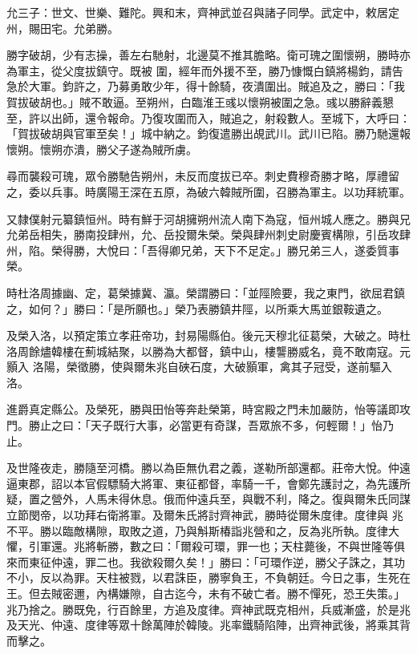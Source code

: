 \begin{pinyinscope}
 允三子：世文、世樂、難陀。興和末，齊神武並召與諸子同學。武定中，敕居定州，賜田宅。允弟勝。



 勝字破胡，少有志操，善左右馳射，北邊莫不推其膽略。衛可瑰之圍懷朔，勝時亦為軍主，從父度拔鎮守。既被
 圍，經年而外援不至，勝乃慷慨白鎮將楊鈞，請告急於大軍。鈞許之，乃募勇敢少年，得十餘騎，夜潰圍出。賊追及之，勝曰：「我賀拔破胡也。」賊不敢逼。至朔州，白臨淮王彧以懷朔被圍之急。彧以勝辭義懇至，許以出師，還令報命。乃復攻圍而入，賊追之，射殺數人。至城下，大呼曰：「賀拔破胡與官軍至矣！」城中納之。鈞復遣勝出覘武川。武川已陷。勝乃馳還報懷朔。懷朔亦潰，勝父子遂為賊所虜。



 尋而襲殺可瑰，眾令勝馳告朔州，未反而度拔已卒。刺史費穆奇勝才略，厚禮留之，委以兵事。時廣陽王深在五原，為破六韓賊所圍，召勝為軍主。以功拜統軍。



 又隸僕射元纂鎮恒州。時有鮮于河胡擁朔州流人南下為寇，恒州城人應之。勝與兄允弟岳相失，勝南投肆州，允、岳投爾朱榮。榮與肆州刺史尉慶賓構隙，引岳攻肆州，陷。榮得勝，大悅曰：「吾得卿兄弟，天下不足定。」勝兄弟三人，遂委質事榮。



 時杜洛周據幽、定，葛榮據冀、瀛。榮謂勝曰：「並陘險要，我之東門，欲屈君鎮之，如何？」勝曰：「是所願也。」榮乃表勝鎮井陘，以所乘大馬並銀鞍遺之。



 及榮入洛，以預定策立孝莊帝功，封易陽縣伯。後元天穆北征葛榮，大破之。時杜洛周餘燼韓樓在薊城結聚，以勝為大都督，鎮中山，樓讋勝威名，竟不敢南寇。元顥入
 洛陽，榮徵勝，使與爾朱兆自硤石度，大破顥軍，禽其子冠受，遂前驅入洛。



 進爵真定縣公。及榮死，勝與田怡等奔赴榮第，時宮殿之門未加嚴防，怡等議即攻門。勝止之曰：「天子既行大事，必當更有奇謀，吾眾旅不多，何輕爾！」怡乃止。



 及世隆夜走，勝隨至河橋。勝以為臣無仇君之義，遂勒所部還都。莊帝大悅。仲遠逼東郡，詔以本官假驃騎大將軍、東征都督，率騎一千，會鄭先護討之，為先護所疑，置之營外，人馬未得休息。俄而仲遠兵至，與戰不利，降之。復與爾朱氏同謀立節閔帝，以功拜右衛將軍。及爾朱氏將討齊神武，勝時從爾朱度律。度律與
 兆不平。勝以臨敵構隙，取敗之道，乃與斛斯椿詣兆營和之，反為兆所執。度律大懼，引軍還。兆將斬勝，數之曰：「爾殺可環，罪一也；天柱薨後，不與世隆等俱來而東征仲遠，罪二也。我欲殺爾久矣！」勝曰：「可環作逆，勝父子誅之，其功不小，反以為罪。天柱被戮，以君誅臣，勝寧負王，不負朝廷。今日之事，生死在王。但去賊密邇，內構嫌隙，自古迄今，未有不破亡者。勝不憚死，恐王失策。」兆乃捨之。勝既免，行百餘里，方追及度律。齊神武既克相州，兵威漸盛，於是兆及天光、仲遠、度律等眾十餘萬陣於韓陵。兆率鐵騎陷陣，出齊神武後，將乘其背而擊之。




\end{pinyinscope}
